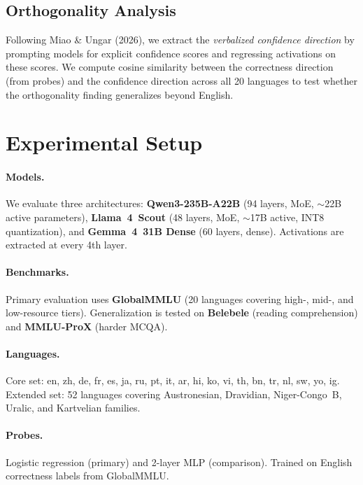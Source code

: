 \documentclass[11pt,a4paper]{article}
\begin{document}
\subsection{Orthogonality Analysis}
\label{sec:ortho}

Following Miao \& Ungar (2026), we extract the \emph{verbalized confidence direction} by prompting models for explicit confidence scores and regressing activations on these scores. We compute cosine similarity between the correctness direction (from probes) and the confidence direction across all 20 languages to test whether the orthogonality finding generalizes beyond English.

\section{Experimental Setup}
\label{sec:setup}

\paragraph{Models.} We evaluate three architectures: \textbf{Qwen3-235B-A22B} (94 layers, MoE, $\sim$22B active parameters), \textbf{Llama~4~Scout} (48 layers, MoE, $\sim$17B active, INT8 quantization), and \textbf{Gemma~4~31B Dense} (60 layers, dense). Activations are extracted at every 4th layer.

\paragraph{Benchmarks.} Primary evaluation uses \textbf{GlobalMMLU} (20 languages covering high-, mid-, and low-resource tiers). Generalization is tested on \textbf{Belebele} (reading comprehension) and \textbf{MMLU-ProX} (harder MCQA).

\paragraph{Languages.} Core set: en, zh, de, fr, es, ja, ru, pt, it, ar, hi, ko, vi, th, bn, tr, nl, sw, yo, ig. Extended set: 52 languages covering Austronesian, Dravidian, Niger-Congo~B, Uralic, and Kartvelian families.

\paragraph{Probes.} Logistic regression (primary) and 2-layer MLP (comparison). Trained on English correctness labels from GlobalMMLU.
\end{document}

